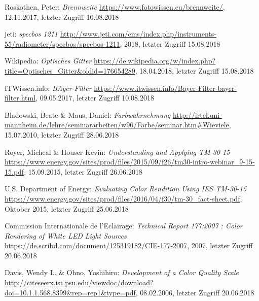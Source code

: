 \begin{thebibliography}{}

Roskothen, Peter:
\emph{\glqq Brennweite\grqq}
\url{https://www.fotowissen.eu/brennweite/}, 12.11.2017, letzter Zugriff 10.08.2018

jeti:
\emph{\glqq specbos 1211\grqq}
\url{http://www.jeti.com/cms/index.php/instruments-55/radiometer/specbos/specbos-1211}, 2018, letzter Zugriff 15.08.2018

Wikipedia:
\emph{\glqq Optisches Gitter\grqq}
\url{https://de.wikipedia.org/w/index.php?title=Optisches_Gitter&oldid=176654289}, 18.04.2018, letzter Zugriff 15.08.2018

ITWissen.info:
\emph{\glqq BAyer-Filter\grqq}
\url{https://www.itwissen.info/Bayer-Filter-bayer-filter.html}, 09.05.2017, letzter Zugriff 10.08.2018

Bladowski, Beate \& Maus, Daniel:
\emph{\glqq Farbwahrnehmung\grqq}
\url{http://irtel.uni-mannheim.de/lehre/seminararbeiten/w96/Farbe/seminar.htm#Wieviele}, 15.07.2010, letzter Zugriff 28.06.2018

Royer, Micheal \& Houser Kevin:
\emph{\glqq Understanding and Applying TM-30-15\grqq}
\url{https://www.energy.gov/sites/prod/files/2015/09/f26/tm30-intro-webinar_9-15-15.pdf}, 15.09.2015, letzter Zugriff 26.06.2018

U.S. Department of Energy:
\emph{\glqq Evaluating Color Rendition Using IES TM-30-15\grqq}
\url{https://www.energy.gov/sites/prod/files/2016/04/f30/tm-30_fact-sheet.pdf}, Oktober 2015, letzter Zugriff 25.06.2018

Commission Internationale de l'Eclairage:
\emph{\glqq Technical Report 177:2007 : Color Rendering of White LED Light Sources\grqq}
\url{https://de.scribd.com/document/125319182/CIE-177-2007}, 2007, letzter Zugriff 20.06.2018

Davis, Wendy L. \& Ohno, Yoshihiro:
\emph{\glqq Development of a Color Quality Scale\grqq}
\url{http://citeseerx.ist.psu.edu/viewdoc/download?doi=10.1.1.568.8399&rep=rep1&type=pdf}, 08.02.2006, letzter Zugriff 20.06.2018


\end{thebibliography}
